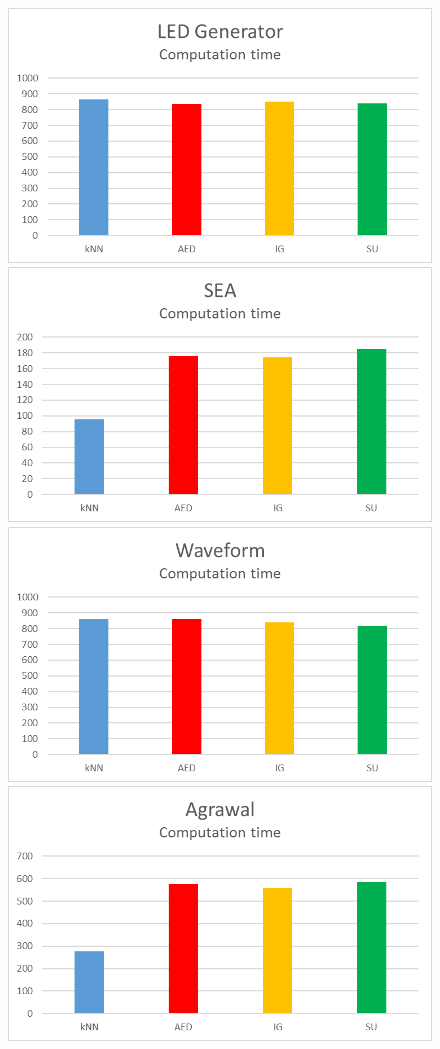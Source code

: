 \begin{figure}[h]
\begin{center}
\includegraphics[scale=0.17]{Graphs/LED/10_time}
\includegraphics[scale=0.17]{Graphs/SEA/time}
\includegraphics[scale=0.17]{Graphs/Waveform/time}
\includegraphics[scale=0.17]{Graphs/Agrawal/time}

\end{center}
\end{figure}

